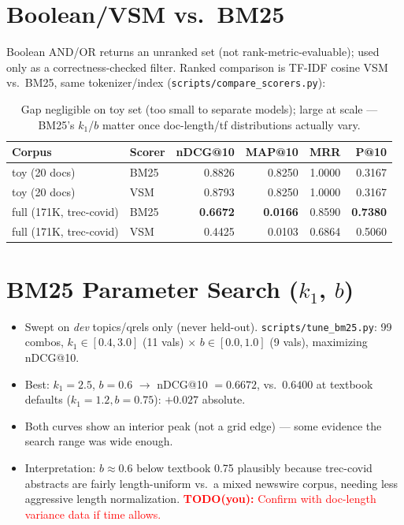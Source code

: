 \documentclass[10pt]{article}
\newcommand{\todo}[1]{\textcolor{red}{\textbf{TODO(you):} #1}}
\begin{document}
\section{Boolean/VSM vs.\ BM25}

Boolean AND/OR returns an unranked set (not rank-metric-evaluable); used only as a correctness-checked filter. Ranked comparison is TF-IDF cosine VSM vs.\ BM25, same tokenizer/index (\texttt{scripts/compare\_scorers.py}):

\begin{table}[h]
\centering\small
\begin{tabular}{llrrrr}
\toprule
Corpus & Scorer & nDCG@10 & MAP@10 & MRR & P@10 \\
\midrule
toy (20 docs) & BM25 & 0.8826 & 0.8250 & 1.0000 & 0.3167 \\
toy (20 docs) & VSM  & 0.8793 & 0.8250 & 1.0000 & 0.3167 \\
full (171K, trec-covid) & BM25 & \textbf{0.6672} & \textbf{0.0166} & 0.8590 & \textbf{0.7380} \\
full (171K, trec-covid) & VSM  & 0.4425 & 0.0103 & 0.6864 & 0.5060 \\
\bottomrule
\end{tabular}
\caption{Gap negligible on toy set (too small to separate models); large at scale --- BM25's $k_1$/$b$ matter once doc-length/tf distributions actually vary.}
\end{table}

\section{BM25 Parameter Search ($k_1$, $b$)}
\begin{itemize}
\item Swept on \emph{dev} topics/qrels only (never held-out). \texttt{scripts/tune\_bm25.py}: 99 combos, $k_1\in[0.4,3.0]$ (11 vals) $\times$ $b\in[0.0,1.0]$ (9 vals), maximizing nDCG@10.
\item Best: $k_1{=}2.5$, $b{=}0.6$ $\to$ nDCG@10 $=0.6672$, vs.\ $0.6400$ at textbook defaults ($k_1{=}1.2,b{=}0.75$): $+0.027$ absolute.
\item Both curves show an interior peak (not a grid edge) --- some evidence the search range was wide enough.
\item Interpretation: $b{\approx}0.6$ below textbook 0.75 plausibly because trec-covid abstracts are fairly length-uniform vs.\ a mixed newswire corpus, needing less aggressive length normalization. \todo{Confirm with doc-length variance data if time allows.}
\end{itemize}
\end{document}

